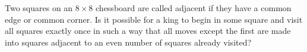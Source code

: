 Two squares on an $8\times 8$ chessboard are called adjacent if they have a common edge or common corner. Is it possible for a king to begin in some square and visit all squares exactly once in such a way that all moves except the first are made into squares adjacent to an even number of squares already visited?